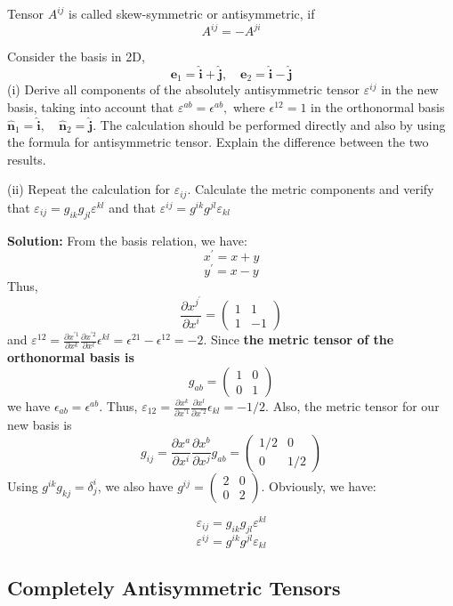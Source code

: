 Tensor $A^{i j}$ is called skew-symmetric or antisymmetric, if
\begin{equation}
A^{i j}=-A^{j i}
\end{equation}
\begin{example}
Consider the basis in 2D,
$$
\mathbf{e}_{1}=\hat{\mathbf{i}}+\hat{\mathbf{j}}, \quad \mathbf{e}_{2}=\hat{\mathbf{i}}-\hat{\mathbf{j}}
$$
(i) Derive all components of the absolutely antisymmetric tensor $\varepsilon^{i j}$ in the new basis, taking into account that $\varepsilon^{a b}=\epsilon^{a b},$ where $\epsilon^{12}=1$ in the orthonormal basis $\hat{\mathbf{n}}_{1}=\hat{\mathbf{i}}, \quad \hat{\mathbf{n}}_{2}=\hat{\mathbf{j}} .$ The calculation should be performed directly and also by using the formula for antisymmetric tensor. Explain the difference between the two results. 

(ii) Repeat the calculation for $\varepsilon_{i j} .$ Calculate the metric components and verify that $\varepsilon_{i j}=g_{i k} g_{j l} \varepsilon^{k l}$ and that $\varepsilon^{i j}=g^{i k} g^{j l} \varepsilon_{k l}$

\end{example}
\textbf{Solution:}
From the basis relation, we have:
$$
x^{\prime}=x+y
$$
$$
y^{\prime}=x-y
$$
Thus, 
$$
\frac{\partial x^{j^{\prime}}}{\partial x^i}=\left(\begin{array}{cc}
{1} & {1}\\
{1} & {-1}
\end{array}\right)
$$
and $\varepsilon^{12}=\frac{\partial x^{\prime 1}}{\partial x^k}\frac{\partial x^{\prime 2}}{\partial x^l}\epsilon^{kl}=\epsilon^{21}-\epsilon^{12}=-2$. Since \textbf{the metric tensor of the orthonormal basis is}
$$
g_{ab}=\left(\begin{array}{cc}
{1} & {0}\\
{0} & {1}
\end{array}\right)
$$
we have $\epsilon_{ab}=\epsilon^{ab}$. Thus, $\varepsilon_{12}=\frac{\partial x^k}{\partial x^{\prime 1}}\frac{\partial x^l}{\partial x^{\prime 2}}\epsilon_{kl}=-1/2$. Also, the metric tensor for our new basis is
$$
g_{ij}=\frac{\partial x^{a}}{\partial x^i}\frac{\partial x^{b}}{\partial x^j}g_{ab}=\left(\begin{array}{cc}
{1/2} & {0}\\
{0} & {1/2}
\end{array}\right)
$$
Using $g^{i k} g_{k j}=\delta_{j}^{i}$, we also have $g^{ij}=\left(\begin{array}{cc}
{2} & {0}\\{0} & {2}\end{array}\right)$. Obviously, we have:
\begin{qt}
$$
\varepsilon_{i j}=g_{i k} g_{j l} \varepsilon^{k l}
$$
$$
\varepsilon^{i j}=g^{i k} g^{j l} \varepsilon_{k l}
$$
\end{qt}

\subsection{Completely Antisymmetric Tensors}